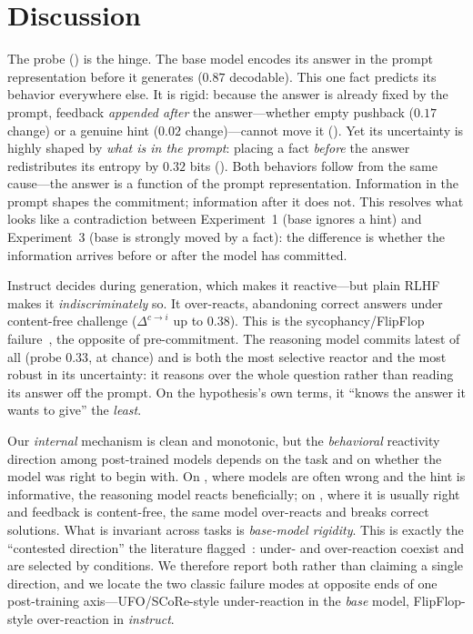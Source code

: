 \section{Discussion}
\label{sec:discussion}

 The probe () is
the hinge. The base model encodes its answer in the prompt representation before it generates
($0.87$ decodable). This one fact predicts its behavior everywhere else. It is rigid: because
the answer is already fixed by the prompt, feedback \emph{appended after} the answer---whether
empty pushback ($0.17$ change) or a genuine hint ($0.02$ change)---cannot move it
(). Yet its uncertainty is highly shaped by \emph{what is in the prompt}:
placing a fact \emph{before} the answer redistributes its entropy by $0.32$ bits
(). Both behaviors follow from the same cause---the answer is a function of
the prompt representation. Information in the prompt shapes the commitment; information after
it does not. This resolves what looks like a contradiction between Experiment~1 (base ignores
a hint) and Experiment~3 (base is strongly moved by a fact): the difference is whether the
information arrives before or after the model has committed.

 Instruct decides during generation, which makes
it reactive---but plain RLHF makes it \emph{indiscriminately} so. It over-reacts, abandoning
correct answers under content-free challenge ($\Delta^{c\rightarrow i}$ up to $0.38$). This is
the sycophancy/FlipFlop failure~\citep{laban2023flipflop}, the opposite of pre-commitment. The
reasoning model commits latest of all (probe $0.33$, at chance) and is both the most selective
reactor and the most robust in its uncertainty: it reasons over the whole question rather than
reading its answer off the prompt. On the hypothesis's own terms, it ``knows the answer it
wants to give'' the \emph{least}.

 Our \emph{internal} mechanism is clean and
monotonic, but the \emph{behavioral} reactivity direction among post-trained models depends on
the task and on whether the model was right to begin with. On \arc, where models are often
wrong and the hint is informative, the reasoning model reacts beneficially; on \gsm, where it
is usually right and feedback is content-free, the same model over-reacts and breaks correct
solutions. What is invariant across tasks is \emph{base-model rigidity}. This is exactly the
``contested direction'' the literature flagged~\citep{ufo2025,kumar2024score,laban2023flipflop}:
under- and over-reaction coexist and are selected by conditions. We therefore report both
rather than claiming a single direction, and we locate the two classic failure modes at
opposite ends of one post-training axis---UFO/SCoRe-style under-reaction in the \emph{base}
model, FlipFlop-style over-reaction in \emph{instruct}.

